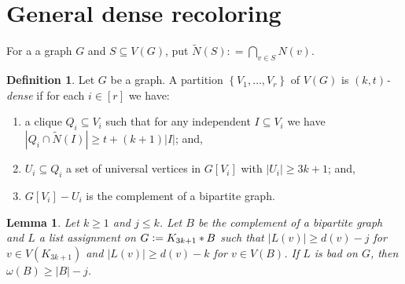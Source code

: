 \documentclass[12pt]{article}
\title{}
\date{\today}
\theoremstyle{plain}
\newtheorem{lem}[thm]{Lemma}
\theoremstyle{definition}
\newtheorem{defn}{Definition}
\theoremstyle{remark}
\newcommand{\set}[1]{\left\{ #1 \right\}}
\newcommand{\card}[1]{\left|#1\right|}
\newcommand{\irange}[1]{\left[#1\right]}
\newcommand{\join}[2]{#1 \mbox{\hspace{2 pt}$\ast$\hspace{2 pt}} #2}
\newcommand{\nint}[1]{\widetilde{N}\left(#1\right)}
\newcommand{\DefinedAs}{\mathrel{\mathop:}=}
\begin{document}
\maketitle

\begin{abstract}
\end{abstract}


\section{General dense recoloring}
For a a graph $G$ and $S \subseteq V(G)$, put $\nint{S} \DefinedAs \bigcap_{v \in S} N(v)$.
\begin{defn}
Let $G$ be a graph.  A partition $\set{V_1, \ldots, V_r}$ of $V(G)$ is \emph{$(k, t)$-dense} if for each $i \in \irange{r}$ we have:
\begin{enumerate}
\item a clique $Q_i \subseteq V_i$ such that for any independent $I \subseteq V_i$ we have $\card{Q_i \cap \nint{I}} \ge t + (k + 1)|I|$; and,
\item $U_i \subseteq Q_i$ a set of universal vertices in $G[V_i]$ with $\card{U_i} \ge 3k + 1$; and,
\item $G[V_i] - U_i$ is the complement of a bipartite graph.
\end{enumerate}
\end{defn}

\begin{lem}\label{BipartiteComplementCliqueJoinLow}
Let $k \ge 1$ and $j \le k$.  Let $B$ be the complement of a bipartite graph and $L$ a list assignment on $G \DefinedAs \join{K_{3k+1}}{B}$ such that $\card{L(v)} \ge d(v)-j$ for $v \in V(K_{3k+1})$ and $\card{L(v)} \ge d(v)-k$ for $v \in V(B)$.  If $L$ is bad on $G$, then $\omega(B) \geq \card{B} - j$.
\end{lem}
\end{document}
